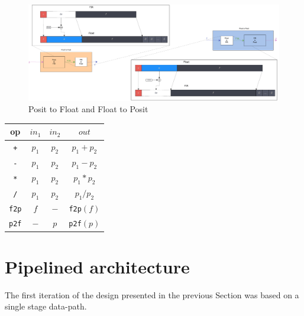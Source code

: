 \begin{figure}
    \centering
    \includegraphics[width=\textwidth]{figures/posit_to_float_and_float_to_posit.pdf}
    \caption{Posit to Float and Float to Posit}
    \label{fig:posittofloatandfloattoposit}
\end{figure}

\begin{table}
\begin{center}
\begin{tabular}{||c c c | c||}
    \hline
    op & $in_1$ & $in_2$ & $out$ \\ [0.5ex]
    \hline\hline
    \texttt{+} & $p_1$ & $p_2$ & $p_1 + p_2$ \\
    \hline
    \texttt{-} & $p_1$ & $p_2$ & $p_1 - p_2$ \\
    \hline
    \texttt{*} & $p_1$ & $p_2$ & $p_1 * p_2$ \\
    \hline
    \texttt{/} & $p_1$ & $p_2$ & $p_1 / p_2$ \\
    \hline
    \texttt{f2p} & $f$ & $-$ & \texttt{f2p}$(f)$ \\
    \hline
    \texttt{p2f} & $-$ & $p$ & \texttt{p2f}$(p)$ \\
    \hline
\end{tabular}
\label{Tab:table_ops_ppu}
\end{center}
\end{table}





\section{Pipelined architecture}\label{pipelined_ppu_section}


The first iteration of the design presented in the previous Section was based on a single stage data-path.


